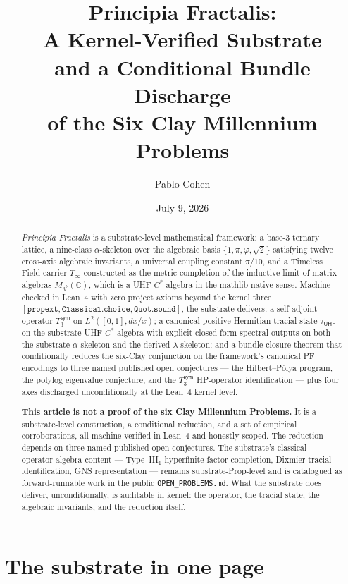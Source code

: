 \documentclass[11pt,a4paper]{amsart}
\title[Principia Fractalis: Substrate + Conditional Bundle Discharge]{Principia Fractalis:\\ A Kernel-Verified Substrate\\ and a Conditional Bundle Discharge\\ of the Six Clay Millennium Problems}
\author{Pablo Cohen}
\date{July 9, 2026}
\theoremstyle{plain}
\theoremstyle{definition}
\begin{document}
\maketitle

\begin{abstract}
\noindent \emph{Principia Fractalis} is a substrate-level mathematical framework: a base-3 ternary lattice, a nine-class $\alpha$-skeleton over the algebraic basis $\{1, \pi, \varphi, \sqrt{2}\}$ satisfying twelve cross-axis algebraic invariants, a universal coupling constant $\pi/10$, and a Timeless Field carrier $T_\infty$ constructed as the metric completion of the inductive limit of matrix algebras $M_{3^k}(\mathbb{C})$, which is a UHF $C^*$-algebra in the mathlib-native sense. Machine-checked in Lean~4 with zero project axioms beyond the kernel three $[\texttt{propext}, \texttt{Classical.choice}, \texttt{Quot.sound}]$, the substrate delivers: a self-adjoint operator $T_3^{\textsf{sym}}$ on $L^2([0,1], dx/x)$; a canonical positive Hermitian tracial state $\tau_{\textsf{UHF}}$ on the substrate UHF $C^*$-algebra with explicit closed-form spectral outputs on both the substrate $\alpha$-skeleton and the derived $\lambda$-skeleton; and a bundle-closure theorem that conditionally reduces the six-Clay conjunction on the framework's canonical PF encodings to three named published open conjectures --- the Hilbert--P\'olya program, the polylog eigenvalue conjecture, and the $T_3^{\textsf{sym}}$ HP-operator identification --- plus four axes discharged unconditionally at the Lean~4 kernel level.

\smallskip

\noindent \textbf{This article is not a proof of the six Clay Millennium Problems.} It is a substrate-level construction, a conditional reduction, and a set of empirical corroborations, all machine-verified in Lean~4 and honestly scoped. The reduction depends on three named published open conjectures. The substrate's classical operator-algebra content --- Type~III$_1$ hyperfinite-factor completion, Dixmier tracial identification, GNS representation --- remains substrate-Prop-level and is catalogued as forward-runnable work in the public \texttt{OPEN\_PROBLEMS.md}. What the substrate does deliver, unconditionally, is auditable in kernel: the operator, the tracial state, the algebraic invariants, and the reduction itself.
\end{abstract}

\section{The substrate in one page}\label{sec:substrate}
\end{document}
